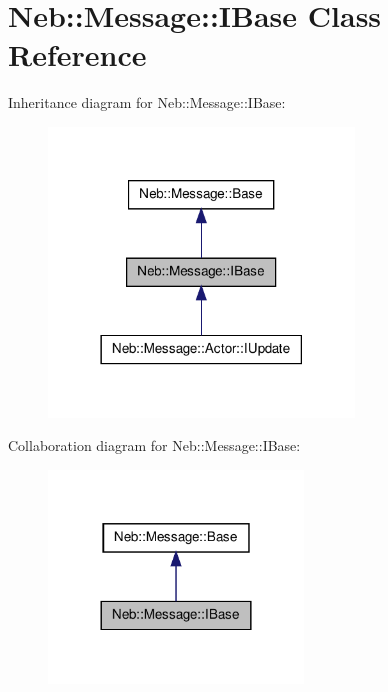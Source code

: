 \hypertarget{classNeb_1_1Message_1_1IBase}{\section{\-Neb\-:\-:\-Message\-:\-:\-I\-Base \-Class \-Reference}
\label{classNeb_1_1Message_1_1IBase}
}


\-Inheritance diagram for \-Neb\-:\-:\-Message\-:\-:\-I\-Base\-:\nopagebreak
\begin{figure}[H]
\begin{center}
\leavevmode
\includegraphics[width=230pt]{classNeb_1_1Message_1_1IBase__inherit__graph}
\end{center}
\end{figure}


\-Collaboration diagram for \-Neb\-:\-:\-Message\-:\-:\-I\-Base\-:\nopagebreak
\begin{figure}[H]
\begin{center}
\leavevmode
\includegraphics[width=192pt]{classNeb_1_1Message_1_1IBase__coll__graph}
\end{center}
\end{figure}
